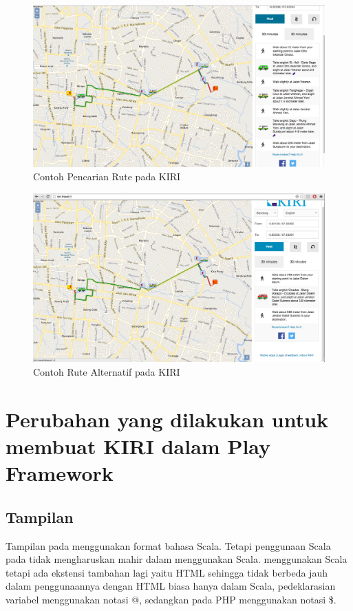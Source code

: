 \begin{enumerate}
\begin{enumerate}
			\begin{figure}[H]
				\centering
				\includegraphics[scale=0.3]{Gambar/KIRI-find}
				\caption{Contoh Pencarian Rute pada KIRI} 
				\label{fig:3_KIRI_find}
			\end{figure}
			
			\begin{figure}[H]
				\centering
				\includegraphics[scale=0.3]{Gambar/KIRI-find-alternate}
				\caption{Contoh Rute Alternatif pada KIRI} 
				\label{fig:3_KIRI_find_alternate}
			\end{figure}
		\end{enumerate}
\end{enumerate}



\section{Perubahan yang dilakukan untuk membuat KIRI dalam Play Framework}
\label{sec:perubahan}
\subsection{Tampilan}
Tampilan pada \play menggunakan format bahasa Scala. Tetapi penggunaan Scala pada \play tidak mengharuskan mahir dalam menggunakan Scala. \play menggunakan Scala tetapi ada ekstensi tambahan lagi yaitu HTML sehingga tidak berbeda jauh dalam penggunaannya dengan HTML biasa hanya dalam Scala, pedeklarasian variabel menggunakan notasi @, sedangkan pada PHP menggunakan notasi \$.


